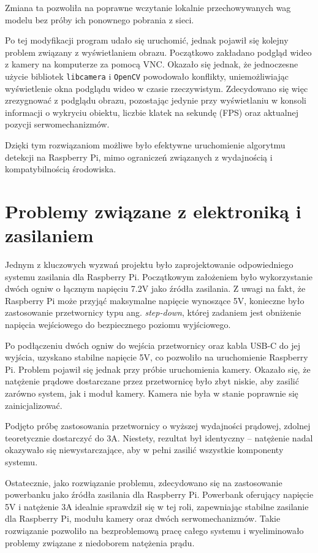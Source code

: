 \documentclass[a4paper,twoside,12pt]{book}
\begin{document}
Zmiana ta pozwoliła na poprawne wczytanie lokalnie przechowywanych wag modelu bez próby ich ponownego pobrania z sieci. 

Po tej modyfikacji program udało się uruchomić, jednak pojawił się kolejny problem związany z wyświetlaniem obrazu. Początkowo zakładano podgląd wideo z kamery na komputerze za pomocą VNC. Okazało się jednak, że jednoczesne użycie bibliotek \texttt{libcamera} i \texttt{OpenCV} powodowało konflikty, uniemożliwiając wyświetlenie okna podglądu wideo w czasie rzeczywistym. Zdecydowano się więc zrezygnować z podglądu obrazu, pozostając jedynie przy wyświetlaniu w konsoli informacji o wykryciu obiektu, liczbie klatek na sekundę (FPS) oraz aktualnej pozycji serwomechanizmów.

Dzięki tym rozwiązaniom możliwe było efektywne uruchomienie algorytmu detekcji na Raspberry Pi, mimo ograniczeń związanych z wydajnością i kompatybilnością środowiska.


\section{Problemy związane z elektroniką i zasilaniem}

Jednym z kluczowych wyzwań projektu było zaprojektowanie odpowiedniego systemu zasilania dla Raspberry Pi. Początkowym założeniem było wykorzystanie dwóch ogniw o łącznym napięciu 7.2V jako źródła zasilania. Z uwagi na fakt, że Raspberry Pi może przyjąć maksymalne napięcie wynoszące 5V, konieczne było zastosowanie przetwornicy typu ang. \textit{step-down}, której zadaniem jest obniżenie napięcia wejściowego do bezpiecznego poziomu wyjściowego.

Po podłączeniu dwóch ogniw do wejścia przetwornicy oraz kabla USB-C do jej wyjścia, uzyskano stabilne napięcie 5V, co pozwoliło na uruchomienie Raspberry Pi. Problem pojawił się jednak przy próbie uruchomienia kamery. Okazało się, że natężenie prądowe dostarczane przez przetwornicę było zbyt niskie, aby zasilić zarówno system, jak i moduł kamery. Kamera nie była w stanie poprawnie się zainicjalizować.

Podjęto próbę zastosowania przetwornicy o wyższej wydajności prądowej, zdolnej teoretycznie dostarczyć do 3A. Niestety, rezultat był identyczny – natężenie nadal okazywało się niewystarczające, aby w pełni zasilić wszystkie komponenty systemu.

Ostatecznie, jako rozwiązanie problemu, zdecydowano się na zastosowanie powerbanku jako źródła zasilania dla Raspberry Pi. Powerbank oferujący napięcie 5V i natężenie 3A idealnie sprawdził się w tej roli, zapewniając stabilne zasilanie dla Raspberry Pi, modułu kamery oraz dwóch serwomechanizmów. Takie rozwiązanie pozwoliło na bezproblemową pracę całego systemu i wyeliminowało problemy związane z niedoborem natężenia prądu.
\end{document}
